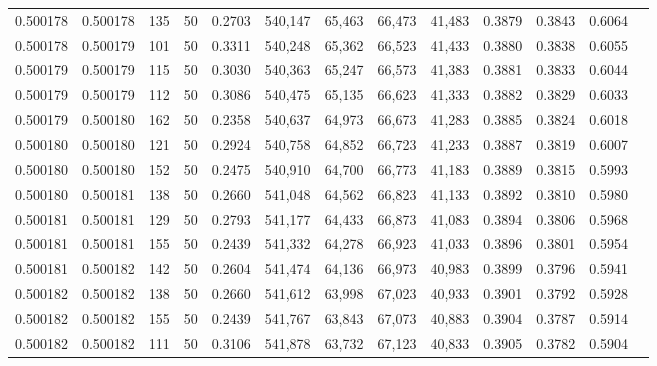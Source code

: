 \begin{tabular}{rrrrrrrrrrrrr}
0.500178 & 0.500178 &   135 &  50 &                                     0.2703 & 540,147 &  65,463 &  66,473 &  41,483 & 0.3879 & 0.3843 & 0.6064 \\
0.500178 & 0.500179 &   101 &  50 &                                     0.3311 & 540,248 &  65,362 &  66,523 &  41,433 & 0.3880 & 0.3838 & 0.6055 \\
0.500179 & 0.500179 &   115 &  50 &                                     0.3030 & 540,363 &  65,247 &  66,573 &  41,383 & 0.3881 & 0.3833 & 0.6044 \\
0.500179 & 0.500179 &   112 &  50 &                                     0.3086 & 540,475 &  65,135 &  66,623 &  41,333 & 0.3882 & 0.3829 & 0.6033 \\
0.500179 & 0.500180 &   162 &  50 &                                     0.2358 & 540,637 &  64,973 &  66,673 &  41,283 & 0.3885 & 0.3824 & 0.6018 \\
0.500180 & 0.500180 &   121 &  50 &                                     0.2924 & 540,758 &  64,852 &  66,723 &  41,233 & 0.3887 & 0.3819 & 0.6007 \\
0.500180 & 0.500180 &   152 &  50 &                                     0.2475 & 540,910 &  64,700 &  66,773 &  41,183 & 0.3889 & 0.3815 & 0.5993 \\
0.500180 & 0.500181 &   138 &  50 &                                     0.2660 & 541,048 &  64,562 &  66,823 &  41,133 & 0.3892 & 0.3810 & 0.5980 \\
0.500181 & 0.500181 &   129 &  50 &                                     0.2793 & 541,177 &  64,433 &  66,873 &  41,083 & 0.3894 & 0.3806 & 0.5968 \\
0.500181 & 0.500181 &   155 &  50 &                                     0.2439 & 541,332 &  64,278 &  66,923 &  41,033 & 0.3896 & 0.3801 & 0.5954 \\
0.500181 & 0.500182 &   142 &  50 &                                     0.2604 & 541,474 &  64,136 &  66,973 &  40,983 & 0.3899 & 0.3796 & 0.5941 \\
0.500182 & 0.500182 &   138 &  50 &                                     0.2660 & 541,612 &  63,998 &  67,023 &  40,933 & 0.3901 & 0.3792 & 0.5928 \\
0.500182 & 0.500182 &   155 &  50 &                                     0.2439 & 541,767 &  63,843 &  67,073 &  40,883 & 0.3904 & 0.3787 & 0.5914 \\
0.500182 & 0.500182 &   111 &  50 &                                     0.3106 & 541,878 &  63,732 &  67,123 &  40,833 & 0.3905 & 0.3782 & 0.5904 \\

\end{tabular}
